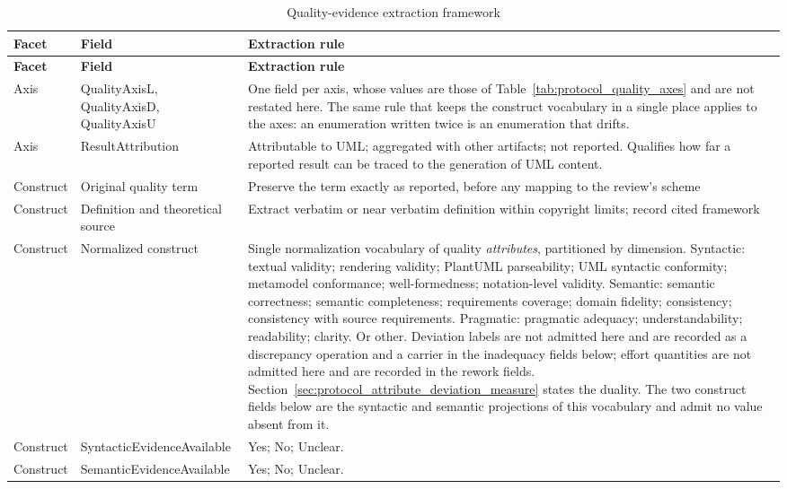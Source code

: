 \begin{longtable}{p{} p{} p{}}
\caption{Quality-evidence extraction framework}
\label{tab:protocol_quality_evidence_extraction}\\
\toprule
\textbf{Facet} & \textbf{Field} & \textbf{Extraction rule} \\
\midrule
\endfirsthead
\toprule
\textbf{Facet} & \textbf{Field} & \textbf{Extraction rule} \\
\midrule
\endhead
Axis & QualityAxisL, QualityAxisD, QualityAxisU & One field per axis, whose values are those of Table~\ref{tab:protocol_quality_axes} and are not restated here. The same rule that keeps the construct vocabulary in a single place applies to the axes: an enumeration written twice is an enumeration that drifts. \\
Axis & ResultAttribution & Attributable to UML; aggregated with other artifacts; not reported. Qualifies how far a reported result can be traced to the generation of UML content. \\
Construct & Original quality term & Preserve the term exactly as reported, before any mapping to the review's scheme \\
Construct & Definition and theoretical source & Extract verbatim or near verbatim definition within copyright limits; record cited framework \\
Construct & Normalized construct & Single normalization vocabulary of quality \textit{attributes}, partitioned by dimension. Syntactic: textual validity; rendering validity; PlantUML parseability; UML syntactic conformity; metamodel conformance; well-formedness; notation-level validity. Semantic: semantic correctness; semantic completeness; requirements coverage; domain fidelity; consistency; consistency with source requirements. Pragmatic: pragmatic adequacy; understandability; readability; clarity. Or other. Deviation labels are not admitted here and are recorded as a discrepancy operation and a carrier in the inadequacy fields below; effort quantities are not admitted here and are recorded in the rework fields. Section~\ref{sec:protocol_attribute_deviation_measure} states the duality. The two construct fields below are the syntactic and semantic projections of this vocabulary and admit no value absent from it. \\
Construct & SyntacticEvidenceAvailable & Yes; No; Unclear. \\
Construct & SemanticEvidenceAvailable & Yes; No; Unclear. \\

\end{longtable}
